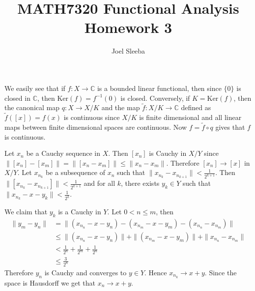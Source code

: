 \documentclass[12pt]{exam}
\theoremstyle{plain} %
\theoremstyle{definition} %
\theoremstyle{remark} %
\begin{document}
\title{MATH7320 Functional Analysis \\ Homework  3}

\author{
Joel Sleeba \\
}

\maketitle
\printanswers
\unframedsolutions

\begin{questions}

  \question
  \begin{solution}
    We easily see that if $f:X \to \mathbb{C}$ is a bounded linear functional, then since $\{ 0 \}$ is closed in $\mathbb{C}$, then $\textrm{Ker}(f) = f^{-1}(0)$ is closed. Conversely, if $K = \textrm{Ker}(f)$, then the canonical map $q: X \to X/K$ and the map $\tilde{f}: X/K \to \mathbb{C}$ defined as $\tilde{f}([x]) = f(x)$ is continuous since $X/K$ is finite dimensional and all linear maps between finite dimensional spaces are continuous. Now $f = \tilde{f}\circ q$ gives that $f$ is continuous.
  \end{solution}

  \question
  \begin{solution}
    Let $x_n$ be a Cauchy sequence in $X$. Then $[x_n]$ is Cauchy in $X/Y$ since $\|[x_n] - [x_m]\| = \|[x_n -  x_m]\| \le \|x_n - x_m\|$. Therefore $[x_n] \to [x]$ in $X/Y$. Let $x_{n_k}$ be a subsequence of $x_n$ such that $\|x_{n_k} - x_{n_{k+1}}\| < \frac{1}{2^{k+1}}$. Then $\|[x_{n_k} - x_{n_{k+1}}]\| < \frac{1}{2^{k+1}}$ and for all $k$, there exists $y_k \in Y$ such that $\|x_{n_k} - x - y_k\| < \frac{1}{2^k}$.

    We claim that $y_k$ is a Cauchy in $Y$. Let $0 < n \le m$, then \begin{align*}
      \|y_m - y_n\| &= \|(x_{n_n} - x - y_n) - (x_{n_m} - x - y_m) - (x_{n_n} - x_{n_m})\|  \\ 
               & \le \|(x_{n_n} - x - y_n)\|  + \|(x_{n_m} - x - y_m)\| + \|x_{n_n} - x_{n_m}\|  \\ 
               & < \frac{1}{2^n} + \frac{1}{2^m} + \frac{1}{2^n} \\ 
               & \le \frac{3}{2^n}
    \end{align*}
    Therefore $y_n$ is Cauchy and converges to $y \in Y$. Hence $x_{n_k} \to x+y$. Since the space is Hausdorff we get that $x_n \to x+y$.
  \end{solution}



\end{questions}
\end{document}
